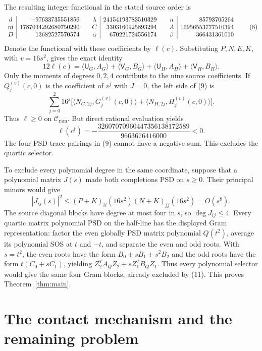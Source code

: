 \documentclass[10pt]{article}
\newcommand{\Cr}{\mathcal C_{\mathrm{ram}}}
\newcommand{\ip}[2]{\langle #1,#2\rangle}
\begin{document}
The resulting integer functional in the stated source order is
\[
\begin{array}{c|r@{\qquad}c|r@{\qquad}c|r}
 d&-97633735551856&\lambda&24154193783510329&n&85793705264\\
 m&1787034292680750290&C&3303160925893294&A&16956553777510394\\
 D&13682527570574&\alpha&670221724556174&\beta&366431361010
\end{array}
                                                               \tag{8}
\]
Denote the functional with these coefficients by $\ell(c)$.
Substituting $P,N,E,K$, with $v=16s^2$, gives
the exact identity
\[
 \boxed{12\ell(c)=
 \ip{\mathsf U_G}{A_G}+\ip{\mathsf V_G}{B_G}
 +\ip{\mathsf U_H}{A_H}+\ip{\mathsf V_H}{B_H}.}             \tag{9}
\]
Only the moments of degrees $0,2,4$ contribute to the nine source
coefficients. If $Q_j^{(v)}(c,0)$ is the coefficient of $v^j$ with $J=0$,
the left side of (9) is
\[
 \sum_{j=0}^2 16^j\bigl[
 \ip{N_{G,2j}}{G_j^{(v)}(c,0)}+
 \ip{N_{H,2j}}{H_j^{(v)}(c,0)}\bigr].                     \tag{10}
\]
Thus $\ell\ge0$ on $\Cr$. But direct rational evaluation yields
\[
 \boxed{\ell(c^\dagger)=
 -\frac{32607070960447356138172589}{9663676416000}<0.}      \tag{11}
\]
The four PSD trace pairings in (9) cannot have a negative sum. This
excludes the quartic selector.

To exclude every polynomial degree in the same coordinate, suppose that
a polynomial matrix $J(s)$ made both completions PSD on $s\geq0$.
Their principal minors would give
\[
 |J_{ij}(s)|^2\leq(P+K)_{ii}(16s^2)(N+K)_{jj}(16s^2)=O(s^8).
\]
The source diagonal blocks have degree at most four in $s$, so
$\deg J_{ij}\leq4$. Every quartic matrix polynomial PSD on the half-line
has the displayed Gram representation: factor the even globally PSD
matrix polynomial $Q(t^2)$, average its polynomial SOS at $t$ and $-t$,
and separate the even and odd roots. With $s=t^2$, the even roots have the form
$B_0+sB_1+s^2B_2$ and the odd roots have the form
$t(C_0+sC_1)$, yielding $Z_2^TA_QZ_2+sZ_1^TB_QZ_1$.
Thus every polynomial selector would give the same four Gram blocks,
already excluded by (11). This proves Theorem~\ref{thm:main}.

\section{The contact mechanism and the remaining problem}
\end{document}
